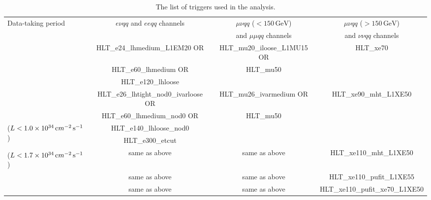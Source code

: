 \begin{landscape}
\begin{table}[p]
  \caption{The list of triggers used in the analysis.} \label{tab:triggers}
\begin{center} 
\small
\begin{tabular}{|l|c|c|c|}
\hline
\multirow{2}{*}{Data-taking period} & \multirow{2}{*}{$e\nu qq$ and $eeqq$ channels} & $\mu\nu qq$ (\pt{$\mu\nu$}$<150\,\si{\GeV}$) & $\mu\nu qq$ (\pt{$\mu\nu$}$ > 150\,\si{\GeV}$)  \\
&& and $\mu\mu qq$ channels& and $\nu\nu qq$ channels\\
\hline
\hline
\multirow{3}{*}{\centering {2015}} & HLT\_e24\_lhmedium\_L1EM20 OR & HLT\_mu20\_iloose\_L1MU15 OR & \multirow{3}{*}{ HLT\_xe70 } \\
 & HLT\_e60\_lhmedium OR & HLT\_mu50 & \\
 & HLT\_e120\_lhloose & & \\
\hline
\multirow{2}{*}{\centering {2016a (run $< 302919$)}} & HLT\_e26\_lhtight\_nod0\_ivarloose OR & HLT\_mu26\_ivarmedium OR  & \multirow{3}{*}{ HLT\_xe90\_mht\_L1XE50 } \\
 & HLT\_e60\_lhmedium\_nod0 OR & HLT\_mu50 &  \\ 
\multirow{2}{*}{($L<1.0\times10^{34}\,{\textrm cm}^{-2}\,{\textrm s}^{-1}$)} & HLT\_e140\_lhloose\_nod0 & & \\
 & HLT\_e300\_etcut & & \\
\hline
{\centering {2016b (run $\geq 302919$)}} & \multirow{2}{*}{same as above} & \multirow{2}{*}{same as above}  &  \multirow{2}{*}{HLT\_xe110\_mht\_L1XE50} \\
($L<1.7\times10^{34}\,{\textrm cm}^{-2}\,{\textrm s}^{-1}$) & & &\\
\hline
{\centering {2017}} & same as above & same as above  &  HLT\_xe110\_pufit\_L1XE55 \\
\hline
{\centering {2018}} & same as above & same as above  &  HLT\_xe110\_pufit\_xe70\_L1XE50  \\
\hline
\end{tabular}
\end{center}
\end{table}
\end{landscape}


